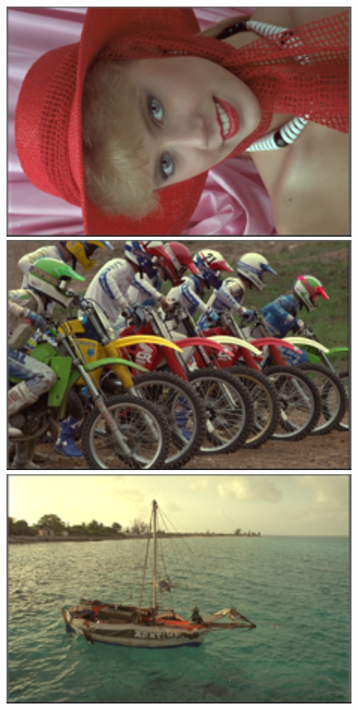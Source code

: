 \documentclass[10pt,twocolumn,letterpaper,sort&compress]{article}
\begin{document}
\begin{figure}
{\begin{minipage}{0.075\textwidth}
\end{minipage}
\begin{minipage}{0.075\textwidth}
\includegraphics[width=1\textwidth]{24images/resize_kodim04.png}
\end{minipage}
\begin{minipage}{0.075\textwidth}
\includegraphics[width=1\textwidth]{24images/resize_kodim05.png}
\end{minipage}
\begin{minipage}{0.075\textwidth}
\includegraphics[width=1\textwidth]{24images/resize_kodim06.png}

\end{minipage}}
\end{figure}
\end{document}

